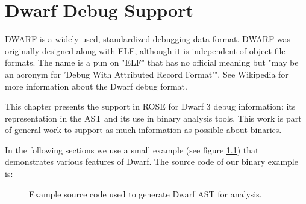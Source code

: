 \chapter{Dwarf Debug Support}

DWARF is a widely used, standardized debugging data format. DWARF was originally designed
along with ELF, although it is independent of object file formats. The name is a
pun on "ELF" that has no official meaning but "may be an acronym for 'Debug With
Attributed Record Format'".  See Wikipedia for more information about the Dwarf 
debug format.

This chapter presents the support in ROSE for Dwarf 3 debug information; its 
representation in the AST and its use in binary analysis tools.  This work is part of
general work to support as much information as possible about binaries.

In the following sections we use a small example (see figure \ref{Tutorial:dwarfAnalysisExampleSourceCode}) 
that demonstrates various features of Dwarf. The source code of our binary example is:


\begin{figure}[!h]
{\indent
{\mySmallFontSize

\begin{latexonly}
   
\end{latexonly}

\begin{htmlonly}
   
\end{htmlonly}

}
}
\caption{Example source code used to generate Dwarf AST for analysis.}
\label{Tutorial:dwarfAnalysisExampleSourceCode}
\end{figure}


